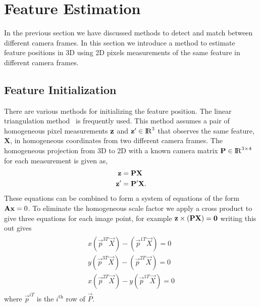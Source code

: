 \section{Feature Estimation}
\label{sec:feature_estimation}

In the previous section we have discussed methods to detect and match between
different camera frames. In this section we introduce a method to estimate
feature positions in 3D using 2D pixels measurements of the same feature in
different camera frames.

\subsection{Feature Initialization}
\label{subsec:linear_triangulation}

There are various methods for initializing the feature position. The linear
triangulation method~\cite{Hartley2003} is frequently used. This method assumes
a pair of homogeneous pixel measurements ${{\mathbf{z}}}$ and ${{\mathbf{z}}}' \in
{\rm I\!R}^{3}$ that observes the same feature, $\mathbf{X}$, in homogeneous
coordinates from two different camera frames. The homogeneous projection from
3D to 2D with a known camera matrix ${\mathbf{P}} \in {\rm I\!R}^{3 \times 4}$
for each measurement is given as,
%
\begin{align}
\begin{split}
	{{\mathbf{z}}} &= \mathbf{P} \mathbf{X} \\
	{{\mathbf{z}}}' &= \mathbf{P}' \mathbf{X}.
\end{split}
\end{align}
%
These equations can be combined to form a system of equations of the form
${\mathbf{A}} {\mathbf{x}} = 0$. To eliminate the homogeneous scale factor we apply a
cross product to give three equations for each image point, for example
${{\mathbf{z}}} \times ({\mathbf{P}} {\mathbf{X}}) = {\mathbf{0}}$ writing this out gives
%
\begin{align}
\label{eq:linear_triangulation_derivation}
\begin{split}
  x (\Vec{p}^{3T} \Vec{X}) - (\Vec{p}^{1T} \Vec{X}) = 0 \\
  y (\Vec{p}^{3T} \Vec{X}) - (\Vec{p}^{2T} \Vec{X}) = 0 \\
  x (\Vec{p}^{2T} \Vec{X}) - y (\Vec{p}^{1T} \Vec{X}) = 0
\end{split}
\end{align}
%
where $\Vec{p}^{iT}$ is the $i^{\mbox{th}}$ row of $\Vec{P}$.

